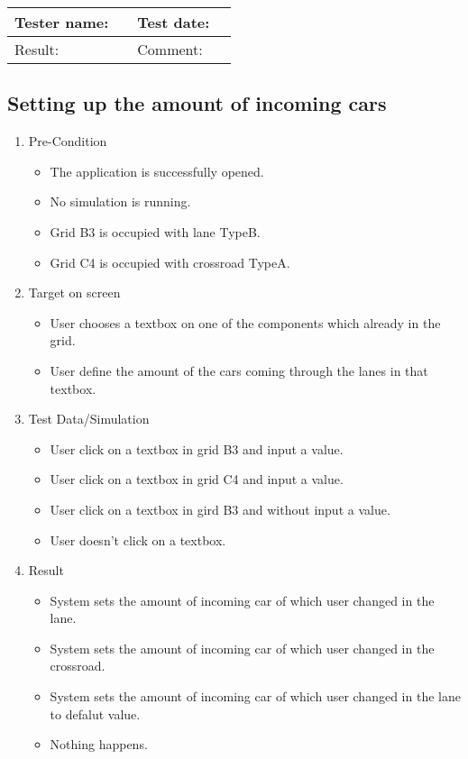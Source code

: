 \begin{tabularx}{\textwidth}{|p{3cm}X|p{3cm}X|}\hline
	Tester name: &  & Test date: & \\\hline
	Result: &   \pass & Comment: & \\\hline
\end{tabularx}

\newpage

\subsection{Setting up the amount of incoming cars }

\begin{enumerate}
	\item Pre-Condition
	\begin{itemize}
		\item The application is successfully opened.
		\item No simulation is running.
		\item Grid B3 is occupied with lane TypeB.
		\item Grid C4 is occupied with crossroad TypeA.
	\end{itemize}
	\item Target on screen
	\begin{itemize}
		\item User chooses a textbox on one of the components which already in the grid.
		\item User define the amount of the cars coming through the lanes in that textbox.
	\end{itemize}
	\item Test Data/Simulation
	\begin{itemize}
		\item User click on a textbox in grid B3 and input a value.
		\item User click on a textbox in grid C4 and input a value.
		\item User click on a textbox in gird B3 and without input a value.
		\item User doesn't click on a textbox.
	\end{itemize}
	\item Result
	\begin{itemize}
		\item System sets the amount of incoming car of which user changed in the lane.
		\item System sets the amount of incoming car of which user changed in the crossroad.
		\item System sets the amount of incoming car of which user changed in the lane to defalut value.
		\item Nothing happens. 
	\end{itemize}
\end{enumerate}

